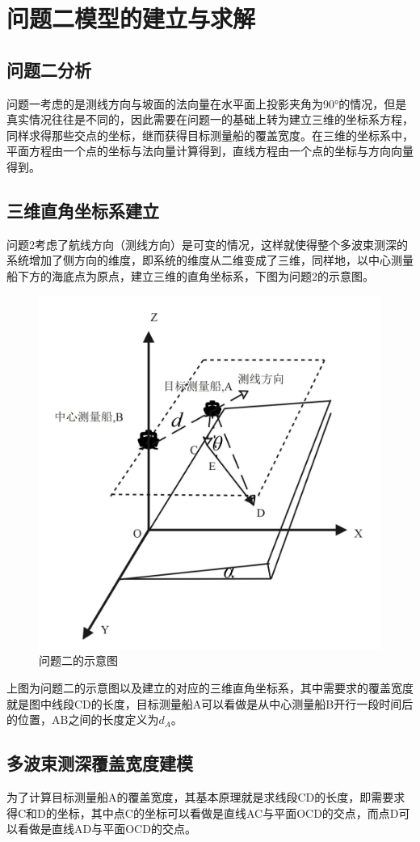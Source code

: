 \documentclass[12pt,a4paper]{article}
\begin{document}
\section{问题二模型的建立与求解}
	\subsection{问题二分析}
	问题一考虑的是测线方向与坡面的法向量在水平面上投影夹角为90°的情况，但是真实情况往往是不同的，因此需要在问题一的基础上转为建立三维的坐标系方程，同样求得那些交点的坐标，继而获得目标测量船的覆盖宽度。在三维的坐标系中，平面方程由一个点的坐标与法向量计算得到，直线方程由一个点的坐标与方向向量得到。
	\subsection{三维直角坐标系建立}
	问题2考虑了航线方向（测线方向）是可变的情况，这样就使得整个多波束测深的系统增加了侧方向的维度，即系统的维度从二维变成了三维，同样地，以中心测量船下方的海底点为原点，建立三维的直角坐标系，下图为问题2的示意图。
	\begin{figure}[H]
		\centering
		\includegraphics[width=0.8\linewidth]{media/image22}
		\caption{问题二的示意图}
		\label{fig2}
	\end{figure}

上图为问题二的示意图以及建立的对应的三维直角坐标系，其中需要求的覆盖宽度就是图中线段CD的长度，目标测量船A可以看做是从中心测量船B开行一段时间后的位置，AB之间的长度定义为${{d}_{A}}$。

\subsection{多波束测深覆盖宽度建模}
为了计算目标测量船A的覆盖宽度，其基本原理就是求线段CD的长度，即需要求得C和D的坐标，其中点C的坐标可以看做是直线AC与平面OCD的交点，而点D可以看做是直线AD与平面OCD的交点。
\end{document}
